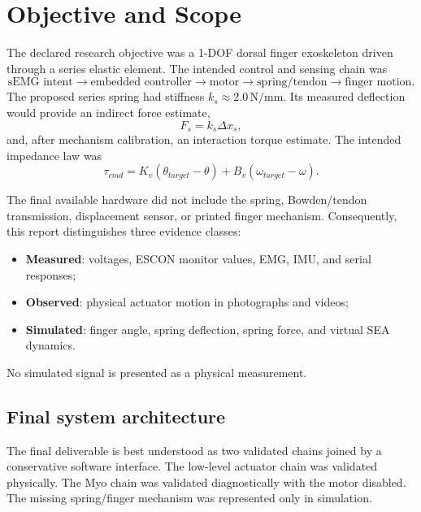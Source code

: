 \documentclass[11pt,a4paper]{report}
\newcommand{\measured}{\textbf{Measured}}
\newcommand{\observed}{\textbf{Observed}}
\newcommand{\simulated}{\textbf{Simulated}}
\begin{document}
\tableofcontents

\chapter{Objective and Scope}

The declared research objective was a 1-DOF dorsal finger exoskeleton driven through a series elastic element. The intended control and sensing chain was
\[
\text{sEMG intent}\rightarrow\text{embedded controller}\rightarrow\text{motor}\rightarrow
\text{spring/tendon}\rightarrow\text{finger motion}.
\]
The proposed series spring had stiffness $k_s\approx2.0\,\mathrm{N/mm}$. Its measured deflection would provide an indirect force estimate,
\begin{equation}
F_s=k_s\Delta x_s,
\end{equation}
and, after mechanism calibration, an interaction torque estimate. The intended impedance law was
\begin{equation}
\tau_{cmd}=K_v(\theta_{target}-\theta)+B_v(\omega_{target}-\omega).
\end{equation}

The final available hardware did not include the spring, Bowden/tendon transmission, displacement sensor, or printed finger mechanism. Consequently, this report distinguishes three evidence classes:
\begin{itemize}
  \item \measured: voltages, ESCON monitor values, EMG, IMU, and serial responses;
  \item \observed: physical actuator motion in photographs and videos;
  \item \simulated: finger angle, spring deflection, spring force, and virtual SEA dynamics.
\end{itemize}
No simulated signal is presented as a physical measurement.

\section{Final system architecture}

The final deliverable is best understood as two validated chains joined by a conservative software interface. The low-level actuator chain was validated physically. The Myo chain was validated diagnostically with the motor disabled. The missing spring/finger mechanism was represented only in simulation.
\end{document}
